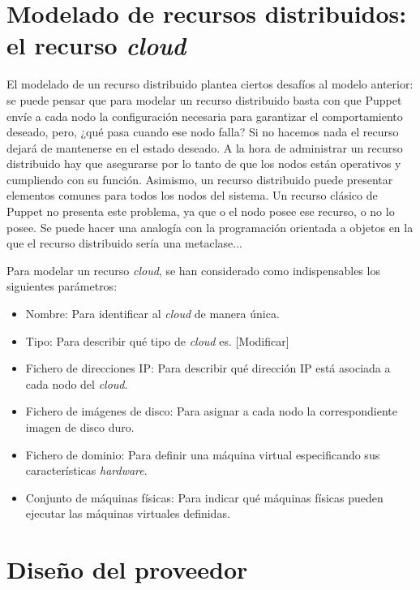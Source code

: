 \section{Modelado de recursos distribuidos: el recurso \emph{cloud}}

El modelado de un recurso distribuido plantea ciertos desafíos al modelo anterior: se puede pensar que para modelar un recurso distribuido basta con que Puppet envíe a cada nodo la configuración necesaria para garantizar el comportamiento deseado, pero, ¿qué pasa cuando ese nodo falla? Si no hacemos nada el recurso dejará de mantenerse en el estado deseado. A la hora de administrar un recurso distribuido hay que asegurarse por lo tanto de que los nodos están operativos y cumpliendo con su función.
Asimismo, un recurso distribuido puede presentar elementos comunes para todos los nodos del sistema. Un recurso clásico de Puppet no presenta este problema, ya que o el nodo posee ese recurso, o no lo posee. Se puede hacer una analogía con la programación orientada a objetos en la que el recurso distribuido sería una metaclase...

Para modelar un recurso \emph{cloud}, se han considerado como indispensables los siguientes parámetros:
\begin{itemize}
\item Nombre: Para identificar al \emph{cloud} de manera única.
\item Tipo: Para describir qué tipo de \emph{cloud} es. [Modificar]
\item Fichero de direcciones IP: Para describir qué dirección IP está asociada a cada nodo del \emph{cloud}.
\item Fichero de imágenes de disco: Para asignar a cada nodo la correspondiente imagen de disco duro.
\item Fichero de dominio: Para definir una máquina virtual especificando sus características \emph{hardware}.
\item Conjunto de máquinas físicas: Para indicar qué máquinas físicas pueden ejecutar las máquinas virtuales definidas.
\end{itemize}


\section{Diseño del proveedor}

